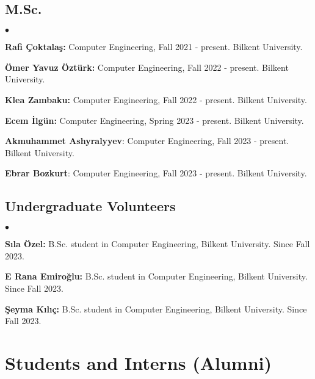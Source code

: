 \documentclass[margin,line]{res}
\newenvironment{list2}{
  \begin{list}{$\bullet$}{%
      \setlength{\itemsep}{0.1cm}
      \setlength{\parsep}{0in} \setlength{\parskip}{0in}
      \setlength{\topsep}{0in} \setlength{\partopsep}{0in} 
      \setlength{\leftmargin}{0.2in}}}{\end{list}}
\begin{document}
\begin{resume}
\vspace*{-.4cm}
\subsection{\small \sc M.Sc.}
\begin{list2}
  \item
  {\bf Rafi Çoktalaş:} Computer Engineering, Fall 2021 - present.
  Bilkent University.
    \item
  {\bf Ömer Yavuz Öztürk:} Computer Engineering, Fall 2022 - present.
  Bilkent University. 
  \item
  {\bf Klea Zambaku:} Computer Engineering, Fall 2022 - present.
  Bilkent University. 
  \item
  {\bf Ecem İlgün:} Computer Engineering, Spring 2023 - present. Bilkent University. 
  \item 
  \textbf{Akmuhammet Ashyralyyev}: Computer Engineering, Fall 2023 - present. Bilkent University. 
    \item 
  \textbf{Ebrar Bozkurt}: Computer Engineering, Fall 2023 - present. Bilkent University. 
\end{list2}

\vspace*{-.4cm}
  \subsection{\small \sc Undergraduate Volunteers}
  \begin{list2}
\item {\bf Sıla Özel:} B.Sc. student in Computer Engineering,  Bilkent University. Since Fall 2023.
\item {\bf E Rana Emiroğlu:} B.Sc. student in Computer Engineering,  Bilkent University. Since Fall 2023.
\item {\bf Şeyma Kılıç:} B.Sc. student in Computer Engineering,  Bilkent University. Since Fall 2023.
    \end{list2}



\section{\sc Students and Interns (Alumni)}
\vspace*{-.4cm}


\end{resume}
\end{document}
